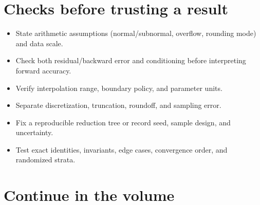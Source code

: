 \section{Checks before trusting a result}\label{appendix-cb5af353ef77-checks-before-trusting-a-result}

\begin{itemize}
\tightlist
\item
  State arithmetic assumptions (normal/subnormal, overflow, rounding mode) and data scale.
\item
  Check both residual/backward error and conditioning before interpreting forward accuracy.
\item
  Verify interpolation range, boundary policy, and parameter units.
\item
  Separate discretization, truncation, roundoff, and sampling error.
\item
  Fix a reproducible reduction tree or record seed, sample design, and uncertainty.
\item
  Test exact identities, invariants, edge cases, convergence order, and randomized strata.
\end{itemize}

\section{Continue in the volume}\label{appendix-cb5af353ef77-continue-in-the-volume}

